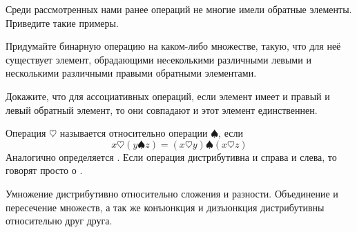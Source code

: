 \begin{exercise}
Среди рассмотренных нами ранее операций не многие имели обратные элементы. Приведите такие примеры.
\end{exercise}

\begin{exercise}
Придумайте бинарную операцию на каком-либо множестве, такую, что для неё существует элемент, обрадающими неcеколькими различными левыми и несколькими различными правыми обратными элементами.
\end{exercise}

\begin{exercise}
Докажите, что для ассоциативных операций, если элемент имеет и правый и левый обратный элемент, то они совпадают и этот элемент единственнен.
\end{exercise}

\begin{definition}
Операция $\heartsuit$ называется  относительно операции $\spadesuit$, если
$$x\heartsuit (y\spadesuit z) = (x\heartsuit y) \spadesuit (x \heartsuit z)$$
Аналогично определяется . Если операция дистрибутивна и справа и слева, то говорят просто о .
\end{definition}

\begin{example}
Умножение дистрибутивно относительно сложения и разности. Объединение и пересечение множеств, а так же конъюнкция и дизъюнкция дистрибутивны относительно друг друга.
\end{example}